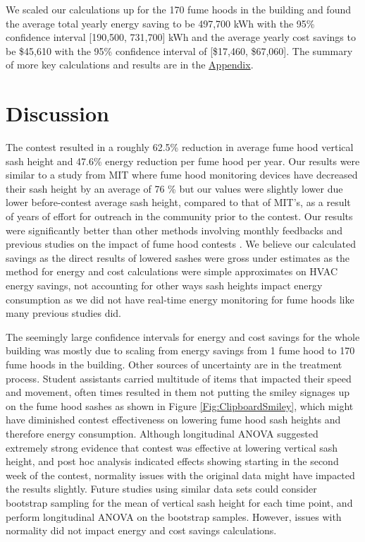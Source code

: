 \documentclass[12pt, twocolumn]{article}
\begin{document}
We scaled our calculations up for the 170 fume hoods in the building and found the average total yearly energy saving to be 497,700 kWh with the 95\% confidence interval [190,500, 731,700] kWh and the average yearly cost savings to be \$45,610 with the 95\% confidence interval of [\$17,460, \$67,060]. The summary of more key calculations and results are in the \hyperref[Sec:Appendix]{Appendix}.

\section*{Discussion}\label{Sec:Discussion}
The contest resulted in a roughly 62.5\% reduction in average fume hood vertical sash height and 47.6\% energy reduction per fume hood per year. Our results were similar to a study from MIT where fume hood monitoring devices have decreased their sash height by an average of 76 \% \cite{Kongoletos2021} but our values were slightly lower due lower before-contest average sash height, compared to that of MIT's, as a result of years of effort for outreach in the community prior to the contest. Our results were significantly better than other methods involving monthly feedbacks \cite{Wesolowski2010} and previous studies on the impact of fume hood contests \cite{Sawyer2019}. We believe our calculated savings as the direct results of lowered sashes were gross under estimates as the method for energy and cost calculations were simple approximates on HVAC energy savings,  not accounting for other ways sash heights impact energy consumption as we did not have real-time energy monitoring for fume hoods like many previous studies did.

The seemingly large confidence intervals for energy and cost savings for the whole building was mostly due to scaling from energy savings from 1 fume hood to 170 fume hoods in the building. Other sources of uncertainty are in the treatment process. Student assistants carried multitude of items that impacted their speed and movement, often times resulted in them not putting the smiley signages up on the fume hood sashes as shown in Figure \ref{Fig:ClipboardSmiley}, which might have diminished contest effectiveness on lowering fume hood sash heights and therefore energy consumption. Although longitudinal ANOVA suggested extremely strong evidence that contest was effective at lowering vertical sash height, and post hoc analysis indicated effects showing starting in the second week of the contest, normality issues with the original data might have impacted the results slightly. Future studies using similar data sets could consider bootstrap sampling for the mean of vertical sash height for each time point, and perform longitudinal ANOVA on the bootstrap samples. However, issues with normality did not impact energy and cost savings calculations. 
\end{document}
